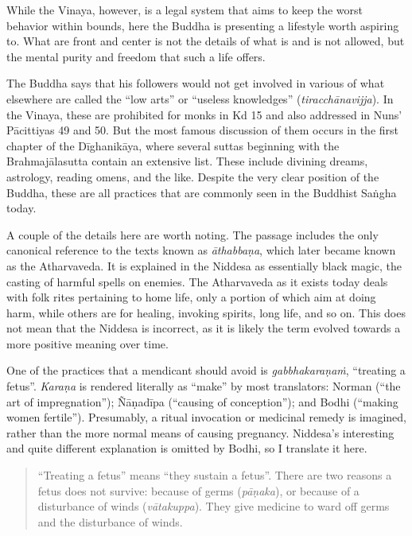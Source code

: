 \documentclass[12pt,openany]{book}%
\begin{document}
While the Vinaya, however, is a legal system that aims to keep the worst behavior within bounds, here the Buddha is presenting a lifestyle worth aspiring to. What are front and center is not the details of what is and is not allowed, but the mental purity and freedom that such a life offers.

The Buddha says that his followers would not get involved in various of what elsewhere are called the “low arts” or “useless knowledges” (\textit{\textsanskrit{tiracchānavijja}}). In the Vinaya, these are prohibited for monks in Kd 15 and also addressed in Nuns’ \textsanskrit{Pācittiyas} 49 and 50. But the most famous discussion of them occurs in the first chapter of the \textsanskrit{Dīghanikāya}, where several suttas beginning with the \textsanskrit{Brahmajālasutta} contain an extensive list. These include divining dreams, astrology, reading omens, and the like. Despite the very clear position of the Buddha, these are all practices that are commonly seen in the Buddhist \textsanskrit{Saṅgha} today.

A couple of the details here are worth noting. The passage includes the only canonical reference to the texts known as \textit{\textsanskrit{āthabbaṇa}}, which later became known as the Atharvaveda. It is explained in the Niddesa as essentially black magic, the casting of harmful spells on enemies. The Atharvaveda as it exists today deals with folk rites pertaining to home life, only a portion of which aim at doing harm, while others are for healing, invoking spirits, long life, and so on. This does not mean that the Niddesa is incorrect, as it is likely the term evolved towards a more positive meaning over time.

One of the practices that a mendicant should avoid is \textit{\textsanskrit{gabbhakaraṇaṁ}}, “treating a fetus”. \textit{\textsanskrit{Karaṇa}} is rendered literally as “make” by most translators: Norman (“the art of impregnation”); \textsanskrit{Ñāṇadīpa} (“causing of conception”); and Bodhi (“making women fertile”). Presumably, a ritual invocation or medicinal remedy is imagined, rather than the more normal means of causing pregnancy. Niddesa’s interesting and quite different explanation is omitted by Bodhi, so I translate it here.

\begin{quotation}%
“Treating a fetus” means “they sustain a fetus”. There are two reasons a fetus does not survive: because of germs (\textit{\textsanskrit{pāṇaka}}), or because of a disturbance of winds (\textit{\textsanskrit{vātakuppa}}). They give medicine to ward off germs and the disturbance of winds.

%
\end{quotation}
\end{document}
